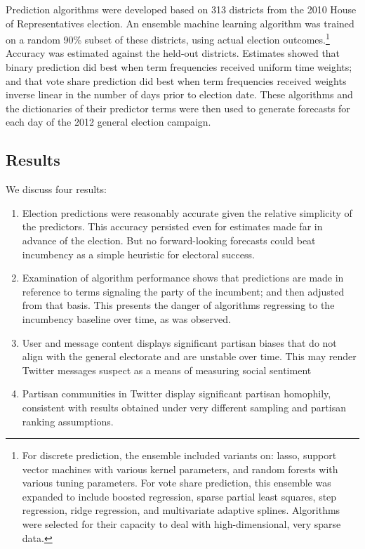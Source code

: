 \documentclass{article}
\begin{document}
Prediction algorithms were developed based on 313 districts from the 2010 House of
Representatives election. An ensemble machine learning
algorithm \cite{van2007super} was trained on a random 90\% subset of
these districts, using actual election outcomes.\footnote{For discrete
  prediction, the ensemble
included variants on: lasso, support vector machines with various
kernel parameters, and random forests with various tuning
parameters. For vote share prediction, this ensemble was expanded to
include boosted regression, sparse partial least squares, step
regression, ridge regression, and multivariate adaptive splines. Algorithms were selected for their capacity to deal with
high-dimensional, very sparse data.} Accuracy was
estimated against the held-out districts. Estimates showed that binary
prediction did best when term frequencies received uniform time
weights; and that vote share prediction did best when term frequencies
received weights inverse linear in the number of days prior to
election date. These algorithms and the dictionaries of their
predictor terms were then used to generate forecasts for each day of
the 2012 general election campaign.

\subsection{Results}
\label{sec:results}

We discuss four results:
\begin{enumerate}
\item Election predictions were reasonably accurate given the relative
  simplicity of the predictors. This accuracy persisted even for
  estimates made far in advance of the election. But no
  forward-looking forecasts could beat incumbency as a simple
  heuristic for electoral success.
\item Examination of algorithm performance shows that predictions are
  made in reference to terms signaling the party of the incumbent; and
  then adjusted from that basis. This presents the danger of
  algorithms regressing to the incumbency baseline over time, as was observed.
\item User and message content displays significant partisan biases
  that do not align with the general electorate and are unstable over time.
  This may render Twitter messages suspect as a means of measuring
  social sentiment
\item Partisan communities in Twitter display significant partisan
  homophily, consistent with results obtained under very different
  sampling and partisan ranking assumptions. 
\end{enumerate}
\end{document}
